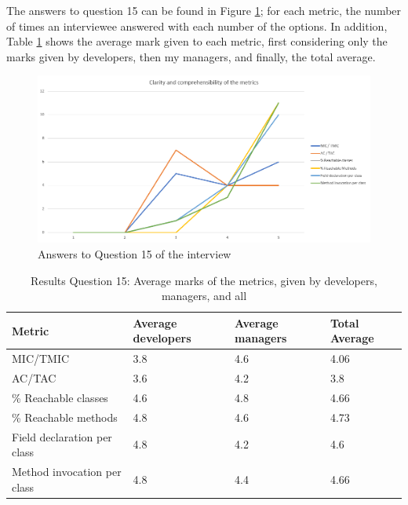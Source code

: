 The answers to question 15 can be found in Figure \ref{fig:interview-15}; for each metric, the number of times an interviewee answered with each number of the options. In addition, Table \ref{table:interview-15} shows the average mark given to each metric, first considering only the marks given by developers, then my managers, and finally, the total average.

\begin{figure}[ht!]
\begin{center}
\includegraphics[width=\textwidth]{figures/interview/Question15.png}
\caption{Answers to Question 15 of the interview}
\label{fig:interview-15}
\end{center}
\end{figure}

\begin{table}[ht!]
    \begin{center}
    \begin{tabular}{|l|l|l|l|}
    \hline
    Metric                      & Average developers  & Average managers  & Total Average \\
    \hline
    MIC/TMIC                    & 3.8                 & 4.6               & 4.06 \\
    AC/TAC                      & 3.6                 & 4.2               & 3.8 \\
    \% Reachable classes        & 4.6                 & 4.8               & 4.66 \\
    \% Reachable methods        & 4.8                 & 4.6               & 4.73 \\
    Field declaration per class & 4.8                 & 4.2               & 4.6 \\
    Method invocation per class & 4.8                 & 4.4               & 4.66 \\
    \hline
    \end{tabular}
    \end{center}
    \caption{Results Question 15: Average marks of the metrics, given by developers, managers, and all}
    \label{table:interview-15}
\end{table}

